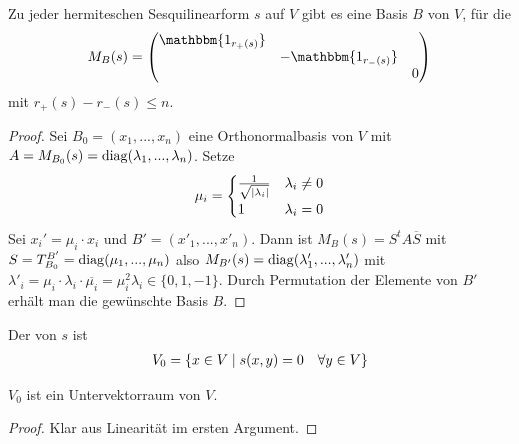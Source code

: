 \begin{conclusion}
	Zu jeder hermiteschen Sesquilinearform $s$ auf $V$ gibt es eine Basis $B$ von $V$, für die 
	\begin{align}
		M_B(s)=\begin{pmatrix}\mathbbm{1_{r_{+}(s)}}&\;&\;\\\;&-\mathbbm{1_{r_{-}(s)}}&\;\\\;&\;&0\end{pmatrix}\notag
	\end{align}
	mit $r_+(s)-r_-(s)\le n$.
\end{conclusion}
\begin{proof}
	Sei $B_0=(x_1,...,x_n)$ eine Orthonormalbasis von $V$ mit $A=M_{B_0}(s)=\operatorname{diag}(\lambda_1,...,\lambda_n)$. Setze 
	\begin{align}
		\mu_i=
		\begin{cases}
			\frac{1}{\sqrt{\vert\lambda_i\vert}} & \lambda_i\neq 0 \\
			1 & \lambda_i=0
		\end{cases}\notag
	\end{align}
	Sei $x_i'=\mu_i\cdot x_i$ und $B'=(x'_1,...,x'_n)$. Dann ist $M_B(s)=S^tA\overline{S}$ mit $S=T^{B'}_{B_0}=\operatorname{diag}(\mu_1,...,\mu_n)$ also $M_{B'}(s)=\operatorname{diag}(\lambda'_1,...,\lambda'_n)$ mit $\lambda'_i=\mu_i\cdot \lambda_i\cdot\overline{\mu_i}=\mu_i^2\lambda_i\in\{0,1,-1\}$. Durch Permutation der Elemente von $B'$ erhält man die gewünschte Basis $B$.
\end{proof}

\begin{definition}[Ausartungsraum]
	Der  von $s$ ist
	\begin{align}
		V_0=\{x\in V\mid s(x,y)=0\quad\forall y\in V\}\notag
	\end{align}
\end{definition}

\begin{lemma}
	$V_0$ ist ein Untervektorraum von $V$.
\end{lemma}
\begin{proof}
	Klar aus Linearität im ersten Argument.
\end{proof}

